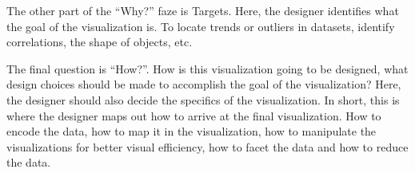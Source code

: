 \documentclass[Report.tex]{subfiles}
\begin{document}
The other part of the “Why?” faze is Targets. Here, the designer identifies what the goal of the visualization is. To locate trends or outliers in datasets, identify correlations, the shape of objects, etc. 

The final question is “How?”. How is this visualization going to be designed, what design choices should be made to accomplish the goal of the visualization? Here, the designer should also decide the specifics of the visualization. In short, this is where the designer maps out how to arrive at the final visualization. How to encode the data, how to map it in the visualization, how to manipulate the visualizations for better visual efficiency, how to facet the data and how to reduce the data.  
\end{document}
